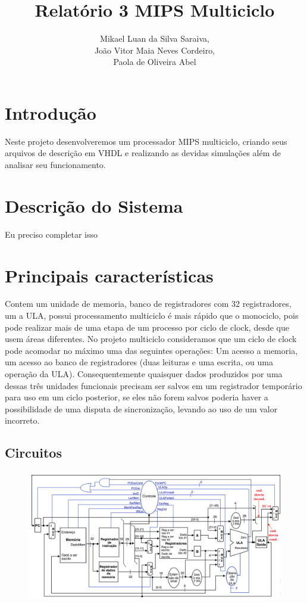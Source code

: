 \documentclass{article}
\title{Relatório 3 \- MIPS Multiciclo}
\author{%
    Mikael Luan da Silva Saraiva, \\
    João Vitor Maia Neves Cordeiro, \\
    Paola de Oliveira Abel
    }
\begin{document}
    \maketitle

    \section{Introdução}

    Neste projeto desenvolveremos um processador MIPS multiciclo, criando seus
    arquivos de descrição em VHDL e realizando as devidas simulações além de
    analisar seu funcionamento.

    \section{Descrição do Sistema}

    Eu preciso completar isso

    \section{Principais características}

    Contem um unidade de memoria, banco de registradores com 32 registradores,
    um a ULA, possui processamento multiciclo é mais rápido que o monociclo,
    pois pode realizar mais de uma etapa de um processo por ciclo de clock,
    desde que usem áreas diferentes. No projeto multiciclo consideramos que um
    ciclo de clock pode acomodar no máximo uma das seguintes operações: Um
    acesso a memoria, um acesso ao banco de registradores (duas leituras e uma
    escrita, ou uma operação da ULA). Consequentemente quaisquer dados
    produzidos por uma dessas três unidades funcionais precisam ser salvos em
    um registrador temporário para uso em um ciclo posterior, se eles não forem
    salvos poderia haver a possibilidade de uma disputa de sincronização,
    levando ao uso de um valor incorreto.

    \subsection{Circuitos}

    \begin{figure}[H]
        \centering %
        \includegraphics[width=\textwidth]{circuito_mips.png} %
        \label{figura:mips}
    \end{figure}
\end{document}
